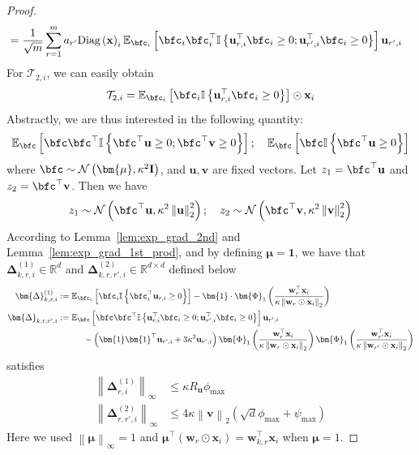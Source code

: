 \documentclass[10pt]{article} %
\theoremstyle{definition}
\theoremstyle{plain}
\newcommand{\paren}[1]{\left(#1\right)}
\newcommand{\norm}[1]{\left\|#1\right\|}
\providecommand{\E}{\mathbb{E}}
\providecommand{\R}{\mathbb{R}}
\def\bfI{{\mathbf{I}}}\def\bfJ{{\mathbf{J}}}\def\bfK{{\mathbf{K}}}\def\bfL{{\mathbf{L}}}
\def\bfu{{\mathbf{u}}}\def\bfv{{\mathbf{v}}}\def\bfw{{\mathbf{w}}}\def\bfx{{\mathbf{x}}}
\begin{document}
\begin{proof}
\begin{align*}
        & = \frac{1}{\sqrt{m}}\sum_{r=1}^ma_{r'}\text{Diag}\paren{\bfx}_i\E_{\bfc_{i}}\left[\bfc_{i}\bfc_{i}^\top\mathbb{I}\left\{\bfu_{r,i}^\top\bfc_{i}\geq 0;\bfu_{r',i}^\top\bfc_{i}\geq 0\right\}\right]\bfu_{r',i}
    \end{align*}
    For $\mathcal{T}_{2,i}$, we can easily obtain
    \[
        \mathcal{T}_{2,i} = \E_{\bfc_{i}}\left[\bfc_{i}\mathbb{I}\left\{\bfu_{r,i}^\top\bfc_{i}\geq 0\right\}\right]\odot\bfx_i
    \]
    Abstractly, we are thus interested in the following quantity:
    \[
        \E_{\bfc}\left[\bfc\bfc^\top\mathbb{I}\left\{\bfc^\top\bfu\geq 0;\bfc^\top\bfv\geq 0\right\}\right]; \quad\E_{\bfc}\left[\bfc\mathbb{I}\left\{\bfc^\top\bfu\geq 0\right\}\right]
    \]
    where $\bfc\sim\mathcal{N}\paren{\bm{\mu},\kappa^2\bfI}$, and $\bfu,\bfv$ are fixed vectors. Let $z_1 = \bfc^\top\bfu$ and $z_2 =\bfc^\top\bfv$. Then we have
    \[
        z_1\sim\mathcal{N}\paren{\bfc^\top\bfu,\kappa^2\norm{\bfu}_2^2};\quad z_2\sim\mathcal{N}\paren{\bfc^\top\bfv,\kappa^2\norm{\bfv}_2^2}
    \]
    According to Lemma~\ref{lem:exp_grad_2nd} and Lemma~\ref{lem:exp_grad_1st_prod}, and by defining $\bm{\mu} = \bm{1}$, we have that $\bm{\Delta}^{(1)}_{k,r,i}\in\R^{d}$ and $\bm{\Delta}^{(2)}_{k,r,r',i}\in\R^{d\times d}$ defined below
    \begin{align*}
        \bm{\Delta}^{(1)}_{k,r,i} & : = \E_{\bfc_{i}}\left[\bfc_{i}\mathbb{I}\left\{\bfc_{i}^\top\bfu_{r,i}\geq 0\right\}\right] - \bm{1}\cdot \bm{\Phi}_1\paren{\frac{\bfw_r^\top\bfx_i}{\kappa\norm{\bfw_r\odot\bfx_i}_2}}\\
        \bm{\Delta}_{k,r,r',i} & : = \E_{\bfc}\left[\bfc\bfc^\top\mathbb{I}\left\{\bfu_{r,i}^\top\bfc_{i}\geq 0;\bfu_{r',i}^\top\bfc_{i}\geq 0\right\}\right]\bfu_{r',i}\\
        & \quad\quad\quad - \paren{\bm{1}\bm{1}^\top\bfu_{r',i} + 3\kappa^2\bfu_{r',i}}\bm{\Phi}_1\paren{\frac{\bfw_r^\top\bfx_i}{\kappa\norm{\bfw_r\odot\bfx_i}_2}}\bm{\Phi}_1\paren{\frac{\bfw_{r'}^\top\bfx_i}{\kappa\norm{\bfw_{r'}\odot\bfx_i}_2}}
    \end{align*}
    satisfies
    \begin{align*}
        \norm{\bm{\Delta}^{(1)}_{r,i}}_{\infty} & \leq \kappa R_{\bfu}\phi_{\max}\\
        \norm{\bm{\Delta}^{(2)}_{r,r',i}}_{\infty} & \leq 4\kappa\norm{\bfv}_2\paren{\sqrt{d}\phi_{\max} + \psi_{\max}}
    \end{align*}
    Here we used $\norm{\bm{\mu}}_{\infty} = 1$ and $\bm{\mu}^\top\paren{\bfw_{r}\odot \bfx_i} = \bfw_{k,r}^\top\bfx_i$ when $\bm{\mu} = 1$. 

\end{proof}
\end{document}
